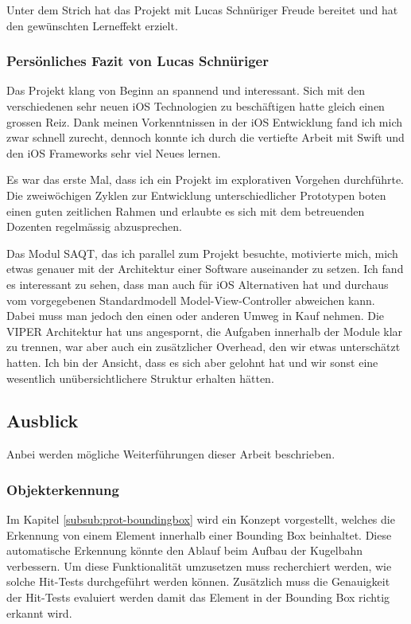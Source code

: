 Unter dem Strich hat das Projekt mit Lucas Schnüriger Freude bereitet und hat den gewünschten Lerneffekt erzielt.

\subsubsection{Persönliches Fazit von Lucas Schnüriger}

Das Projekt klang von Beginn an spannend und interessant.
Sich mit den verschiedenen sehr neuen iOS Technologien zu beschäftigen hatte gleich einen grossen Reiz.
Dank meinen Vorkenntnissen in der iOS Entwicklung fand ich mich zwar schnell zurecht, dennoch konnte ich durch die vertiefte Arbeit mit Swift und den iOS Frameworks sehr viel Neues lernen. %

Es war das erste Mal, dass ich ein Projekt im explorativen Vorgehen durchführte.
Die zweiwöchigen Zyklen zur Entwicklung unterschiedlicher Prototypen boten einen guten zeitlichen Rahmen und erlaubte es sich mit dem betreuenden Dozenten regelmässig abzusprechen.

Das Modul SAQT, das ich parallel zum Projekt besuchte, motivierte mich, mich etwas genauer mit der Architektur einer Software auseinander zu setzen.
Ich fand es interessant zu sehen, dass man auch für iOS Alternativen hat und durchaus vom vorgegebenen Standardmodell Model-View-Controller abweichen kann.
Dabei muss man jedoch den einen oder anderen Umweg in Kauf nehmen. %
Die VIPER Architektur hat uns angespornt, die Aufgaben innerhalb der Module klar zu trennen, war aber auch ein zusätzlicher Overhead, den wir etwas unterschätzt hatten.
Ich bin der Ansicht, dass es sich aber gelohnt hat und wir sonst eine wesentlich unübersichtlichere Struktur erhalten hätten.

\subsection{Ausblick}

Anbei werden mögliche Weiterführungen dieser Arbeit beschrieben.

\subsubsection{Objekterkennung}
Im Kapitel \ref{subsub:prot-boundingbox} wird ein Konzept vorgestellt, welches die Erkennung von einem Element innerhalb einer Bounding Box beinhaltet. Diese automatische Erkennung könnte den Ablauf beim Aufbau der Kugelbahn verbessern. Um diese Funktionalität umzusetzen muss recherchiert werden, wie solche Hit-Tests durchgeführt werden können. Zusätzlich muss die Genauigkeit der Hit-Tests evaluiert werden damit das Element in der Bounding Box richtig erkannt wird.

